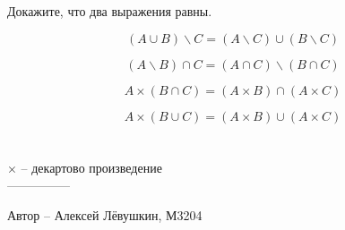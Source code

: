 \question
Докажите, что два выражения равны.

\begin{equation}
    (A \cup B) \backslash C = (A \backslash C) \cup (B \backslash C)
\end{equation}

\begin{equation}
    (A \backslash B) \cap C = (A \cap C) \backslash (B \cap C)
\end{equation}

\begin{equation}
    A \times (B \cap C) = (A \times B) \cap (A \times C)
\end{equation}

\begin{equation}
    A \times (B \cup C) = (A \times B) \cup (A \times C)
\end{equation}
\\
\\
$\times$ -- декартово произведение
\\
---------------

Автор -- Алексей Лёвушкин, М3204